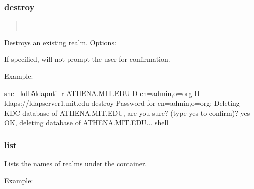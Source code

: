 \documentclass[letterpaper,10pt,english]{sphinxmanual}
\begin{document}
\subsubsection{destroy}
\label{\detokenize{admin/admin_commands/kdb5_ldap_util:destroy}}\label{\detokenize{admin/admin_commands/kdb5_ldap_util:kdb5-ldap-util-view-end}}\label{\detokenize{admin/admin_commands/kdb5_ldap_util:kdb5-ldap-util-destroy}}\begin{quote}

\sphinxAtStartPar
{} {[}\sphinxstylestrong{\sphinxhyphen{}f}{]}
\end{quote}

\sphinxAtStartPar
Destroys an existing realm. Options:
\begin{description}
\sphinxAtStartPar
If specified, will not prompt the user for confirmation.

\end{description}

\sphinxAtStartPar
Example:

\begin{sphinxVerbatim}[commandchars=\\\{\}]
shell\PYGZpc{} kdb5\PYGZus{}ldap\PYGZus{}util \PYGZhy{}r ATHENA.MIT.EDU \PYGZhy{}D cn=admin,o=org \PYGZhy{}H
    ldaps://ldap\PYGZhy{}server1.mit.edu destroy
Password for \PYGZdq{}cn=admin,o=org\PYGZdq{}:
Deleting KDC database of \PYGZsq{}ATHENA.MIT.EDU\PYGZsq{}, are you sure?
(type \PYGZsq{}yes\PYGZsq{} to confirm)? yes
OK, deleting database of \PYGZsq{}ATHENA.MIT.EDU\PYGZsq{}...
shell\PYGZpc{}
\end{sphinxVerbatim}


\subsubsection{list}
\label{\detokenize{admin/admin_commands/kdb5_ldap_util:list}}\label{\detokenize{admin/admin_commands/kdb5_ldap_util:kdb5-ldap-util-destroy-end}}\label{\detokenize{admin/admin_commands/kdb5_ldap_util:kdb5-ldap-util-list}}\begin{quote}

\sphinxAtStartPar
{}
\end{quote}

\sphinxAtStartPar
Lists the names of realms under the container.

\sphinxAtStartPar
Example:
\end{document}

